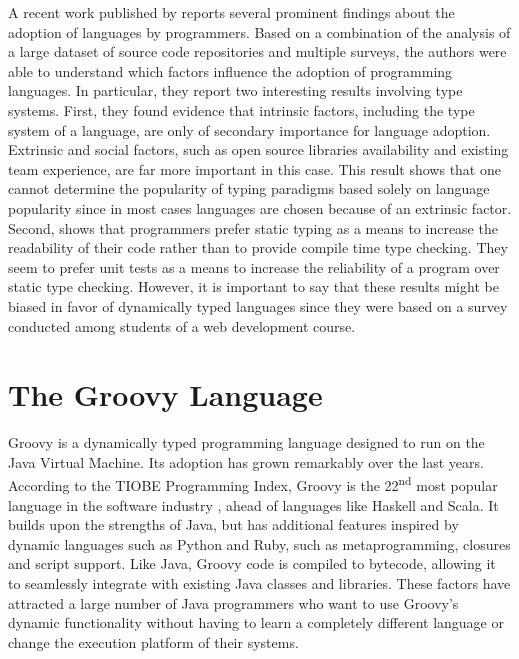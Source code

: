 \documentclass[msc]{ppgccufmg}
\begin{document}
A recent work published by \cite{Meyerovich13} reports several prominent findings about the adoption of languages by programmers.
Based on a combination of the analysis of a large dataset of source code repositories and multiple surveys, the authors were able to understand which factors influence the adoption of programming languages.
In particular, they report two interesting results involving type systems.
First, they found evidence that intrinsic factors, including the type system of a language, are only of secondary importance for language adoption.
Extrinsic and social factors, such as open source libraries availability and existing team experience, are far more important in this case.
This result shows that one cannot determine the popularity of typing paradigms based solely on language popularity since in most cases languages are chosen because of an extrinsic factor.
Second, \cite{Meyerovich13} shows that programmers prefer static typing as a means to increase the readability of their code rather than to provide compile time type checking.
They seem to prefer unit tests as a means to increase the reliability of a program over static type checking.
However, it is important to say that these results might be biased in favor of dynamically typed languages since they were based on a survey conducted among students of a web development course.




\section{The Groovy Language\label{sec:groovy}}
Groovy is a dynamically typed programming language designed to run on the Java Virtual Machine.
Its adoption has grown remarkably over the last years.
According to the TIOBE Programming Index, Groovy is the 22\textsuperscript{nd} most popular language in the software industry \cite{tiobe}, ahead of languages like Haskell and Scala. 
It builds upon the strengths of Java, but has additional features inspired by dynamic languages such as Python and Ruby, such as metaprogramming, closures and script support.
Like Java, Groovy code is compiled to bytecode, allowing it to seamlessly integrate with existing Java classes and libraries. 
These factors have attracted a large number of Java programmers who want to use Groovy's dynamic functionality without having to learn a completely different language or change the execution platform of their systems. 
\end{document}
